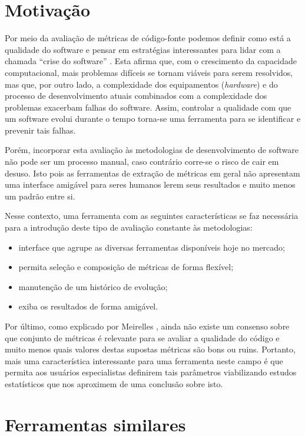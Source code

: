 \documentclass[12pt]{article}
\begin{document}
\section{Motivação}
Por meio da avaliação de métricas de código-fonte podemos definir como está a qualidade do software e pensar em estratégias interessantes para lidar com a chamada ``crise do software'' \cite{nr68}. Esta afirma que, com o crescimento da capacidade computacional, mais problemas difíceis se tornam viáveis para serem resolvidos, mas que, por outro lado, a complexidade dos equipamentos (\textit{hardware}) e do processo de desenvolvimento atuais combinados com a complexidade dos problemas exacerbam falhas do software. Assim, controlar a qualidade com que um software evolui durante o tempo torna-se uma ferramenta para se identificar e prevenir tais falhas.

Porém, incorporar esta avaliação às metodologias de desenvolvimento de software não pode ser um processo manual, caso contrário corre-se o risco de cair em desuso. Isto pois as ferramentas de extração de métricas em geral não apresentam uma interface amigável para seres humanos lerem seus resultados e muito menos um padrão entre si.

Nesse contexto, uma ferramenta com as seguintes características se faz necessária para a introdução deste tipo de avaliação constante às metodologias:

\begin{itemize}
  \item interface que agrupe as diversas ferramentas disponíveis hoje no mercado;
  \item permita seleção e composição de métricas de forma flexível;
  \item manutenção de um histórico de evolução;
  \item exiba os resultados de forma amigável.
\end{itemize}

Por último, como explicado por Meirelles \cite{m13}, ainda não existe um consenso sobre que conjunto de métricas é relevante para se avaliar a qualidade do código e muito menos quais valores destas supostas métricas são bons ou ruins. Portanto, mais uma característica interessante para uma ferramenta neste campo é que permita aos usuários especialistas definirem tais parâmetros viabilizando estudos estatísticos que nos aproximem de uma conclusão sobre isto.

\section{Ferramentas similares}
\end{document}
